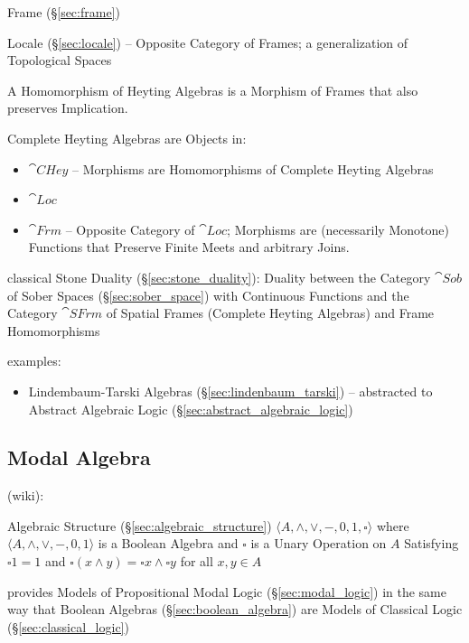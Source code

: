 Frame (\S\ref{sec:frame})

Locale (\S\ref{sec:locale}) -- Opposite Category of Frames; a generalization of
Topological Spaces

A Homomorphism of Heyting Algebras is a Morphism of Frames that also
preserves Implication.

Complete Heyting Algebras are Objects in:
\begin{itemize}
  \item $\cat{CHey}$ -- Morphisms are Homomorphisms of Complete
    Heyting Algebras
  \item $\cat{Loc}$
  \item $\cat{Frm}$ -- Opposite Category of $\cat{Loc}$; Morphisms are
    (necessarily Monotone) Functions that Preserve Finite Meets and
    arbitrary Joins.
\end{itemize}

classical Stone Duality (\S\ref{sec:stone_duality}): Duality between the
Category $\cat{Sob}$ of Sober Spaces (\S\ref{sec:sober_space}) with Continuous
Functions and the Category $\cat{SFrm}$ of Spatial Frames (Complete Heyting
Algebras) and Frame Homomorphisms

examples:
\begin{itemize}
  \item Lindembaum-Tarski Algebras (\S\ref{sec:lindenbaum_tarski}) -- abstracted
    to Abstract Algebraic Logic (\S\ref{sec:abstract_algebraic_logic})
\end{itemize}



\subsection{Modal Algebra}\label{sec:modal_algebra}

(wiki):

Algebraic Structure (\S\ref{sec:algebraic_structure}) $\langle{A, \wedge, \vee,
  -, 0, 1, \square}\rangle$ where $\langle{A, \wedge, \vee, -, 0, 1}\rangle$ is
a Boolean Algebra and $\square$ is a Unary Operation on $A$ Satisfying
$\square{1} = 1$ and $\square(x \wedge y) = \square x \wedge \square y$ for all
$x, y \in A$

provides Models of Propositional Modal Logic (\S\ref{sec:modal_logic}) in the
same way that Boolean Algebras (\S\ref{sec:boolean_algebra}) are Models of
Classical Logic (\S\ref{sec:classical_logic})

